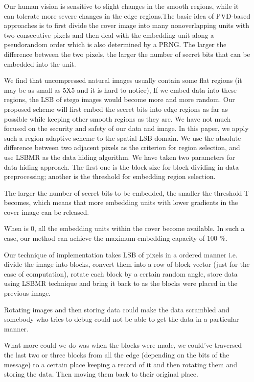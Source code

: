 \documentclass{report}
\begin{document}
\par
Our human vision is sensitive to slight changes in the smooth
regions, while it can tolerate more severe changes in the edge
regions.The
basic idea of PVD-based approaches is to first divide the cover
image into many nonoverlapping units with two consecutive
pixels and then deal with the embedding unit along a pseudorandom
order which is also determined by a PRNG.
The larger the difference between the two pixels, the larger the number of
secret bits that can be embedded into the unit.

\par We find that uncompressed natural images usually
contain some flat regions (it may be as small as 5X5 and it
is hard to notice), If we embed data into these regions, the LSB of stego images would become more and more random.
Our proposed
scheme will first embed the secret bits into edge regions as far
as possible while keeping other smooth regions as they are.
We have not much focused on the security and safety of our data and image.
In this paper, we apply such a region adaptive scheme to the
spatial LSB domain. We use the absolute difference between
two adjacent pixels as the criterion for region selection, and use
LSBMR as the data hiding algorithm. We have taken two parameters for data hiding approach. The first one is the block size for block dividing in data preprocessing;
another is the threshold for embedding region selection.
\par 
The larger the
number of secret bits to be embedded, the smaller the threshold T
becomes, which means that more embedding units with
lower gradients in the cover image can be released.

When is 0, all the embedding units within the cover become
available. In such a case, our method can achieve the maximum
embedding capacity of 100 \%.

\par Our technique of implementation takes LSB of pixels in a ordered manner i.e. divide the image into blocks, convert them into a row of block vector (just for the ease of computation), rotate each block by a certain random angle, store data using LSBMR technique and bring it back to as the blocks were placed in the previous image.

Rotating images and then storing data could make the data scrambled and somebody who tries to debug could not be able to get the data in a particular manner.

What more could we do was when the blocks were made, we could’ve traversed the last two or three blocks from all the edge (depending on the bits of the message) to a certain place keeping a record of it and then rotating them and storing the data. Then moving them back to their original place.
\end{document}
